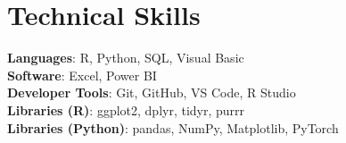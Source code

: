 \documentclass[letterpaper,11pt]{article}
\begin{document}
\section{Technical Skills}
 \begin{itemize}[leftmargin=0.15in, label={}]
    \small{\item{
     \textbf{Languages}{: R, Python, SQL, Visual Basic} \\
     \textbf{Software}{: Excel, Power BI} \\
     \textbf{Developer Tools}{: Git, GitHub, VS Code, R Studio} \\
     \textbf{Libraries (R)}{: ggplot2, dplyr, tidyr, purrr} \\
     \textbf{Libraries (Python)}{: pandas, NumPy, Matplotlib, PyTorch}
    }}
 \end{itemize}


\end{document}
